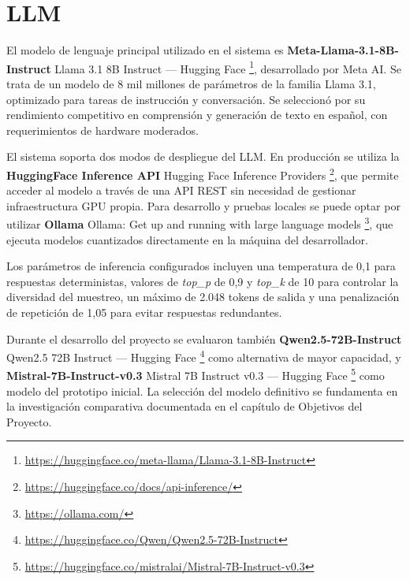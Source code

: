 \section{LLM}
\label{section:5-LLM}

El modelo de lenguaje principal utilizado en el sistema es \textbf{Meta-Llama-3.1-8B-Instruct} Llama 3.1 8B Instruct --- Hugging Face \footnote{\url{https://huggingface.co/meta-llama/Llama-3.1-8B-Instruct}}, desarrollado por Meta AI. Se trata de un modelo de 8 mil millones de parámetros de la familia Llama 3.1, optimizado para tareas de instrucción y conversación. Se seleccionó por su rendimiento competitivo en comprensión y generación de texto en español, con requerimientos de hardware moderados.

El sistema soporta dos modos de despliegue del LLM. En producción se utiliza la \textbf{HuggingFace Inference API} Hugging Face Inference Providers \footnote{\url{https://huggingface.co/docs/api-inference/}}, que permite acceder al modelo a través de una API REST sin necesidad de gestionar infraestructura GPU propia. Para desarrollo y pruebas locales se puede optar por utilizar \textbf{Ollama} Ollama: Get up and running with large language models \footnote{\url{https://ollama.com/}}, que ejecuta modelos cuantizados directamente en la máquina del desarrollador.

Los parámetros de inferencia configurados incluyen una temperatura de 0,1 para respuestas deterministas, valores de \textit{top\_p} de 0,9 y \textit{top\_k} de 10 para controlar la diversidad del muestreo, un máximo de 2.048 tokens de salida y una penalización de repetición de 1,05 para evitar respuestas redundantes.

Durante el desarrollo del proyecto se evaluaron también \textbf{Qwen2.5-72B-Instruct} Qwen2.5 72B Instruct --- Hugging Face \footnote{\url{https://huggingface.co/Qwen/Qwen2.5-72B-Instruct}} como alternativa de mayor capacidad, y \textbf{Mistral-7B-Instruct-v0.3} Mistral 7B Instruct v0.3 --- Hugging Face \footnote{\url{https://huggingface.co/mistralai/Mistral-7B-Instruct-v0.3}} como modelo del prototipo inicial. La selección del modelo definitivo se fundamenta en la investigación comparativa documentada en el capítulo de Objetivos del Proyecto.